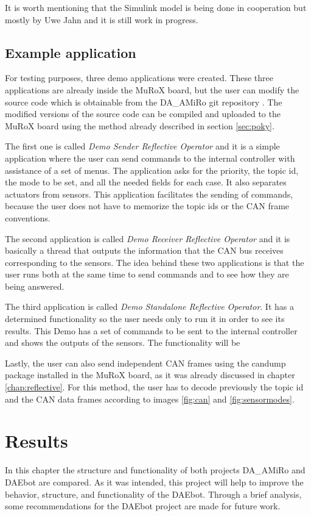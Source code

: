 \documentclass[12pt]{report}%
\begin{document}
It is worth mentioning that the Simulink model is being done in cooperation but mostly by Uwe Jahn and it is still work in progress.

\section{Example application}
\label{sect:example}
For testing purposes, three demo applications were created. These three applications are already inside the MuRoX board, but the user can modify the source code which is obtainable from the DA\_AMiRo git repository \cite{AMiRo_Git}. The modified versions of the source code can be compiled and uploaded to the MuRoX board using the method already described in section \ref{sec:poky}.

The first one is called \textit{Demo Sender Reflective Operator} and it is a simple application where the user can send commands to the internal controller with assistance of a set of menus. The application asks for the priority, the topic id, the mode to be set, and all the needed fields for each case. It also separates actuators from sensors. This application facilitates the sending of commands, because the user does not have to memorize the topic ids or the CAN frame conventions.

The second application is called \textit{Demo Receiver Reflective Operator} and it is basically a thread that outputs the information that the CAN bus receives corresponding to the sensors. The idea behind these two applications is that the user runs both at the same time to send commands and to see how they are being answered.

The third application is called \textit{Demo Standalone Reflective Operator}. It has a determined functionality so the user needs only to run it in order to see its results. This Demo has a set of commands to be sent to the internal controller and shows the outputs of the sensors. The functionality will be


Lastly, the user can also send independent CAN frames using the candump package installed in the MuRoX board, as it was already discussed in chapter \ref{chap:reflective}. For this method, the user has to decode previously the topic id and the CAN data frames according to images \ref{fig:can} and \ref{fig:sensormodes}.

\chapter{Results}
In this chapter the structure and functionality of both projects DA\_AMiRo and DAEbot are compared. As it was intended, this project will help to improve the behavior, structure, and functionality of the DAEbot. Through a brief analysis, some recommendations for the DAEbot project are made for future work.
\end{document}

